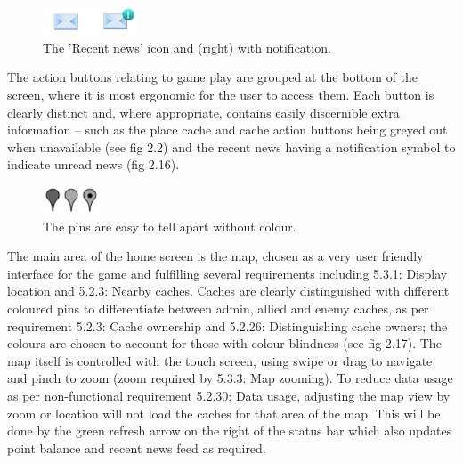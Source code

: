 \begin{figure}
	\vspace{-45pt}
	\begin{center}
	\includegraphics[width=0.25\textwidth]{images/news_icons}
	\caption{The 'Recent news' icon and (right) with notification.}
	\label{news_icons}
	\end{center}
	\vspace{15pt}
\end{figure}

The action buttons relating to game play are grouped at the bottom of the screen, where it is most ergonomic for the user to access them. Each button is clearly distinct and, where appropriate, contains easily discernible extra information – such as the place cache and cache action buttons being greyed out when unavailable (see fig 2.2) and the recent news having a notification symbol to indicate unread news (fig 2.16). 

\begin{figure}
	\vspace{-20pt}
	\begin{center}
	\includegraphics[width=0.15\textwidth]{images/grey_pins}
	\caption{The pins are easy to tell apart without colour.}
	\label{grey_pins}
	\end{center}
	\vspace{-20pt}
\end{figure}

The main area of the home screen is the map, chosen as a very user friendly interface for the game and fulfilling several requirements including 5.3.1: Display location and 5.2.3: Nearby caches. Caches are clearly distinguished with different coloured pins to differentiate between admin, allied and enemy caches, as per requirement 5.2.3: Cache ownership and 5.2.26: Distinguishing cache owners; the colours are chosen to account for those with colour blindness (see fig 2.17). The map itself is controlled with the touch screen, using swipe or drag to navigate and pinch to zoom (zoom required by 5.3.3: Map zooming). To reduce data usage as per non-functional requirement 5.2.30: Data usage, adjusting the map view by zoom or location will not load the caches for that area of the map. This will be done by the green refresh arrow on the right of the status bar which also updates point balance and recent news feed as required.

